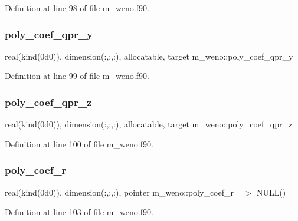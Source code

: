 Definition at line 98 of file m\+\_\+weno.\+f90.

\mbox{\label{namespacem__weno_a2e122ffcf340d423036ed315caae26cd}} 
\subsubsection{\texorpdfstring{poly\+\_\+coef\+\_\+qpr\+\_\+y}{poly\_coef\_qpr\_y}}
{\footnotesize\ttfamily real(kind(0d0)), dimension(\+:,\+:,\+:), allocatable, target m\+\_\+weno\+::poly\+\_\+coef\+\_\+qpr\+\_\+y}



Definition at line 99 of file m\+\_\+weno.\+f90.

\mbox{\label{namespacem__weno_af8ee85fbadf8c00f10e2f57050bf38c6}} 
\subsubsection{\texorpdfstring{poly\+\_\+coef\+\_\+qpr\+\_\+z}{poly\_coef\_qpr\_z}}
{\footnotesize\ttfamily real(kind(0d0)), dimension(\+:,\+:,\+:), allocatable, target m\+\_\+weno\+::poly\+\_\+coef\+\_\+qpr\+\_\+z}



Definition at line 100 of file m\+\_\+weno.\+f90.

\mbox{\label{namespacem__weno_a2e98c94233f9445dde8b9a86687e12c8}} 
\subsubsection{\texorpdfstring{poly\+\_\+coef\+\_\+r}{poly\_coef\_r}}
{\footnotesize\ttfamily real(kind(0d0)), dimension(\+:,\+:,\+:), pointer m\+\_\+weno\+::poly\+\_\+coef\+\_\+r =$>$ N\+U\+LL()}



Definition at line 103 of file m\+\_\+weno.\+f90.

